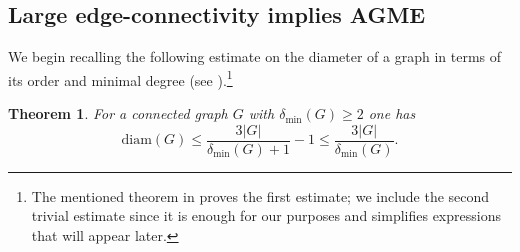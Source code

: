 \documentclass[a4paper,onecolumn,accepted=2024-12-14]{quantumarticle}
\newtheorem{theorem}{Theorem}[section]%
\theoremstyle{plain}
\begin{document}
\subsection{Large edge-connectivity implies AGME}

We begin recalling
the following estimate on the diameter of a graph in terms of its order and minimal degree
(see \cite[Theorem~1]{erdos}).\footnote{The mentioned theorem in \cite{erdos}
proves the first estimate; we include the second trivial estimate since it is enough for our purposes and simplifies expressions that will appear later.}
\begin{theorem}\label{thm:erdos}
For a connected graph $G$ with $\delta_{\mathrm{min}}(G)\geq 2$ one has
\begin{equation}\label{ineqdiam}
\mathrm{diam}(G)\leq\frac{3|G|}{\delta_{\mathrm{min}}(G)+1}-1
\leq \frac{3|G|}{\delta_{\mathrm{min}}(G)}.
\end{equation}
\end{theorem}
\end{document}

